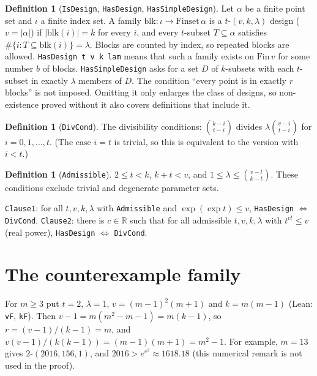 \documentclass[11pt]{article}
\theoremstyle{definition}
\newtheorem{definition}[theorem]{Definition}
\begin{document}
\begin{definition}[\texttt{IsDesign}, \texttt{HasDesign}, \texttt{HasSimpleDesign}]
Let $\alpha$ be a finite point set and $\iota$ a finite index set. A family
$\mathrm{blk}:\iota\to\mathrm{Finset}\,\alpha$ is a $t$-$(v,k,\lambda)$ design ($v=|\alpha|$) if
$|\mathrm{blk}(i)|=k$ for every $i$, and every $t$-subset $T\subseteq\alpha$ satisfies
$\#\{i : T\subseteq \mathrm{blk}(i)\}=\lambda$. Blocks are counted by index, so repeated blocks are
allowed. \texttt{HasDesign t v k lam} means that such a family exists on $\mathrm{Fin}\,v$ for some
number $b$ of blocks. \texttt{HasSimpleDesign} asks for a set $D$ of $k$-subsets with each
$t$-subset in exactly $\lambda$ members of $D$. The condition ``every point is in exactly $r$
blocks'' is not imposed. Omitting it only enlarges the class of designs, so non-existence proved
without it also covers definitions that include it.
\end{definition}

\begin{definition}[\texttt{DivCond}]
The divisibility conditions: $\binom{k-i}{t-i}$ divides $\lambda\binom{v-i}{t-i}$ for
$i=0,1,\dots,t$. (The case $i=t$ is trivial, so this is equivalent to the version with $i<t$.)
\end{definition}

\begin{definition}[\texttt{Admissible}]\label{def:adm}
$2\le t<k$, $k+t<v$, and $1\le\lambda\le\binom{v-t}{k-t}$. These conditions exclude trivial and
degenerate parameter sets.
\end{definition}

\texttt{Clause1}: for all $t,v,k,\lambda$ with \texttt{Admissible} and $\exp(\exp t)\le v$,
\texttt{HasDesign} $\iff$ \texttt{DivCond}. \texttt{Clause2}: there is $c\in\mathbb R$ such that
for all admissible $t,v,k,\lambda$ with $t^{ct}\le v$ (real power), \texttt{HasDesign} $\iff$
\texttt{DivCond}.

\section{The counterexample family}

For $m\ge 3$ put $t=2$, $\lambda=1$, $v=(m-1)^2(m+1)$ and $k=m(m-1)$ (Lean: \texttt{vF},
\texttt{kF}). Then $v-1=m(m^2-m-1)=m(k-1)$, so $r=(v-1)/(k-1)=m$, and
$v(v-1)/(k(k-1))=(m-1)(m+1)=m^2-1$. For example, $m=13$ gives $2$-$(2016,156,1)$, and
$2016>e^{e^2}\approx 1618.18$ (this numerical remark is not used in the proof).
\end{document}
